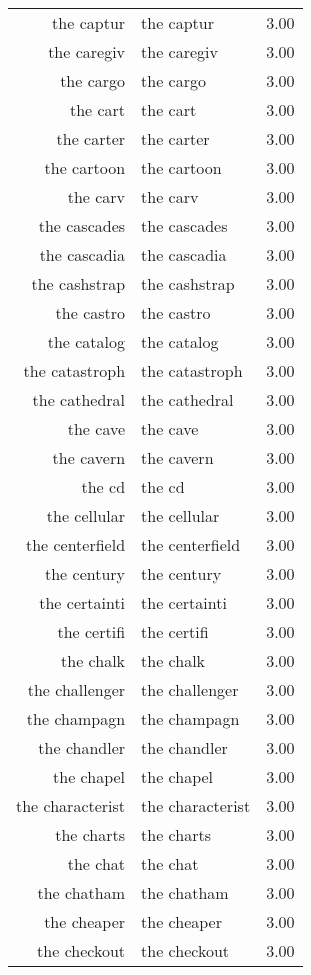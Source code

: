 \begin{table}[ht]
\begin{tabular}{rlr}
  the captur & the captur & 3.00 \\ 
  the caregiv & the caregiv & 3.00 \\ 
  the cargo & the cargo & 3.00 \\ 
  the cart & the cart & 3.00 \\ 
  the carter & the carter & 3.00 \\ 
  the cartoon & the cartoon & 3.00 \\ 
  the carv & the carv & 3.00 \\ 
  the cascades & the cascades & 3.00 \\ 
  the cascadia & the cascadia & 3.00 \\ 
  the cashstrap & the cashstrap & 3.00 \\ 
  the castro & the castro & 3.00 \\ 
  the catalog & the catalog & 3.00 \\ 
  the catastroph & the catastroph & 3.00 \\ 
  the cathedral & the cathedral & 3.00 \\ 
  the cave & the cave & 3.00 \\ 
  the cavern & the cavern & 3.00 \\ 
  the cd & the cd & 3.00 \\ 
  the cellular & the cellular & 3.00 \\ 
  the centerfield & the centerfield & 3.00 \\ 
  the century & the century & 3.00 \\ 
  the certainti & the certainti & 3.00 \\ 
  the certifi & the certifi & 3.00 \\ 
  the chalk & the chalk & 3.00 \\ 
  the challenger & the challenger & 3.00 \\ 
  the champagn & the champagn & 3.00 \\ 
  the chandler & the chandler & 3.00 \\ 
  the chapel & the chapel & 3.00 \\ 
  the characterist & the characterist & 3.00 \\ 
  the charts & the charts & 3.00 \\ 
  the chat & the chat & 3.00 \\ 
  the chatham & the chatham & 3.00 \\ 
  the cheaper & the cheaper & 3.00 \\ 
  the checkout & the checkout & 3.00 \\ 

\end{tabular}
\end{table}
